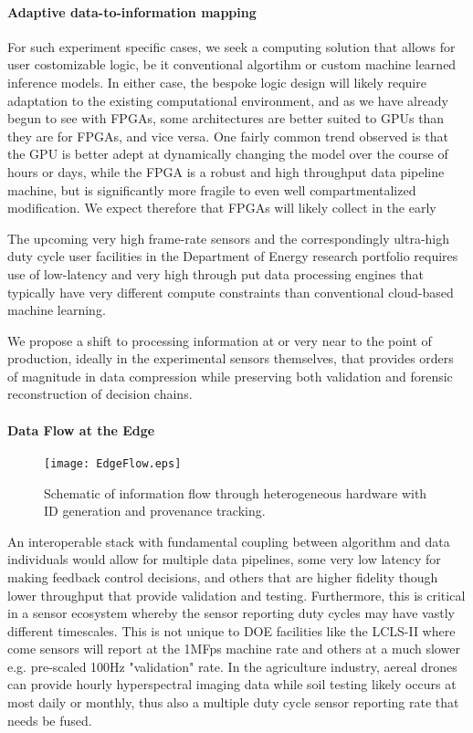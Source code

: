 \documentclass{article}
\begin{document}
\paragraph{Adaptive data-to-information mapping}
For such experiment specific cases, we seek a computing solution that allows for user costomizable logic, be it conventional algortihm or custom machine learned inference models.
In either case, the bespoke logic design will likely require adaptation to the existing computational environment, and as we have already begun to see with FPGAs, some architectures are better suited to GPUs than they are for FPGAs, and vice versa.
One fairly common trend observed is that the GPU is better adept at dynamically changing the model over the course of hours or days, while the FPGA is a robust and high throughput data pipeline machine, but is significantly more fragile to even well compartmentalized modification.
We expect therefore that FPGAs will likely collect in the early 


The upcoming very high frame-rate sensors and the correspondingly ultra-high duty cycle user facilities in the Department of Energy research portfolio requires use of low-latency and very high through put data processing engines that typically have very different compute constraints than conventional cloud-based machine learning.

We propose a shift to processing information at or very near to the point of production, ideally in the experimental sensors themselves, that provides orders of magnitude in data compression while preserving both validation and forensic reconstruction of decision chains.

\paragraph{Data Flow at the Edge}
\begin{figure}
	\centerline{\texttt{[image: EdgeFlow.eps]}}
	\caption{
		\label{fig::EdgeFlow}
		Schematic of information flow through heterogeneous hardware with ID generation and provenance tracking.
		}
\end{figure}

An interoperable stack with fundamental coupling between algorithm and data individuals would allow for multiple data pipelines, some very low latency for making feedback control decisions, and others that are higher fidelity though lower throughput that provide validation and testing.  Furthermore, this is critical in a sensor ecosystem whereby the sensor reporting duty cycles may have vastly different timescales. 
This is not unique to DOE facilities like the LCLS-II where come sensors will report at the 1MFps machine rate and others at a much slower e.g. pre-scaled 100Hz "validation" rate.  
In the agriculture industry, aereal drones can provide hourly hyperspectral imaging data while soil testing likely occurs at most daily or monthly, thus also a multiple duty cycle sensor reporting rate that needs be fused.
\end{document}
